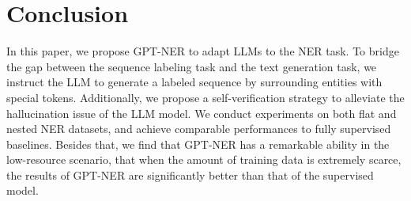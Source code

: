 \documentclass{article}
\begin{document}
\section{Conclusion}
In this paper, we propose GPT-NER to 
adapt LLMs to the NER task.   
To bridge the gap between the sequence labeling task and the text generation task, we instruct the LLM to generate a labeled sequence by surrounding entities with special tokens. 
Additionally, we propose a self-verification strategy to alleviate the hallucination issue of the LLM model. 
We conduct experiments on both flat and nested NER datasets, and achieve comparable performances to fully supervised baselines. 
Besides that, we find that GPT-NER has a remarkable ability in the low-resource scenario, that when the amount of training data is extremely scarce, the results of GPT-NER are significantly better than that of the supervised model.






\newpage
\appendix

\begin{table}[th!]
    \centering
     \caption{Entity annotations of the flat NER dataset CoNLL2003.}
    \label{tab:conll_annotations}
\end{table}
\end{document}
